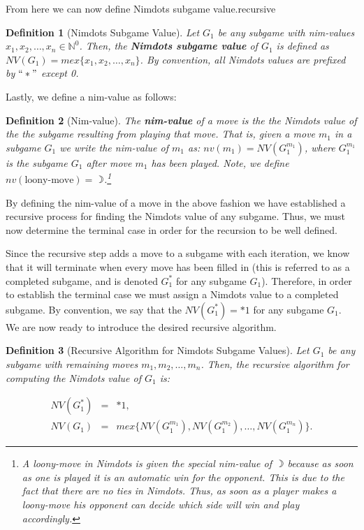 \documentclass[12pt,twoside]{reedthesis}
\newtheorem{mydef}{Definition}
\begin{document}
\noindent
From here we can now define Nimdots subgame value.recursive

\begin{mydef}[Nimdots Subgame Value]
Let $G_1$ be any subgame with nim-values $x_1,x_2,\dots,x_n \in \mathbb N^0$. Then, the \textbf{Nimdots subgame value} of  $G_1$ is defined as \newline $NV(G_1)=mex \{ x_1,x_2,\dots,x_n \}$.  By convention, all Nimdots values are prefixed by $``\ast"$ except 0.
\end{mydef}

\noindent
Lastly, we define a nim-value as follows:

\begin{mydef}[Nim-value]
The \textbf{nim-value} of a move is the the Nimdots value of the the subgame resulting from playing that move.  That is, given a move $m_1$ in a subgame $G_1$ we write the nim-value of $m_1$ as: $nv(m_1) = NV(G^{m_1}_1)$, where $G^{m_1}_1$ is the subgame $G_1$ after move $m_1$ has been played.  Note, we define $nv(\mbox{loony-move}) = \rightmoon$.\footnote[5]{A loony-move in Nimdots is given the special nim-value of $\rightmoon$ because as soon as one is played it is an automatic win for the opponent.  This is due to the fact that there are no ties in Nimdots.  Thus, as soon as a player makes a loony-move his opponent can decide which side will win and play accordingly.}
\end{mydef}

By defining the nim-value of a move in the above fashion we have established a recursive process for finding the Nimdots value of any subgame.  Thus, we must now determine the terminal case in order for the recursion to be well defined.


Since the recursive step adds a move to a subgame with each iteration, we know that it will terminate when every move has been filled in (this is referred to as a completed subgame, and is denoted $G^\ast_1$ for any subgame $G_1$).  Therefore, in order to establish the terminal case we must assign a Nimdots value to a completed subgame.   By convention, we say that the $NV(G^\ast_1) = \ast 1$ for any subgame $G_1$.  We are now ready to introduce the desired recursive algorithm.


\begin{mydef}[Recursive Algorithm for Nimdots Subgame Values]
Let $G_1$ be any subgame with remaining moves $m_1,m_2,\dots,m_n$. Then, the recursive algorithm for computing the Nimdots value of $G_1$ is:

\begin{equation}
\begin{array}{lcl} 
NV(G^\ast_1) & = & \ast 1, \\
NV(G_1) & = & mex \{ NV(G^{m_1}_1),NV(G^{m_2}_1),\dots,NV(G^{m_n}_1) \}.
\end{array}
\end{equation}

\end{mydef}
\end{document}
